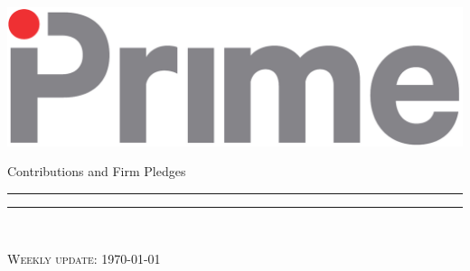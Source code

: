 \begin{titlepage}
\hspace*{-1cm}\begin{minipage}[0.1\textheight]{5cm}
\vspace{0pt}
\includegraphics[height=0.1\textheight]{./figure/logo_prime}
\end{minipage}
\hspace*{1cm}\begin{minipage}{11.3cm}
\vspace{0pt}
\begin{flushright}
\begin{spacing}{1.0}
{\myfont \LARGE Contributions and Firm Pledges}
\end{spacing}
\end{flushright}
\end{minipage}

\hspace*{-1cm}\begin{minipage}[t]{5cm}
\vspace{0pt}
\textcolor{whoblue!15}{\rule{5cm}{0.57\textheight}}
\end{minipage}
\hspace*{1cm}\begin{minipage}[t]{11.3cm}
\vspace{0pt}
\textcolor{whoblue}{\rule{11.3cm}{0.5mm}}\\[0.535\textheight]
\begin{flushright}
\cleanlookdateon \textsc{\myfont \large Weekly update: \today}
\end{flushright}
\end{minipage}

\end{titlepage}
